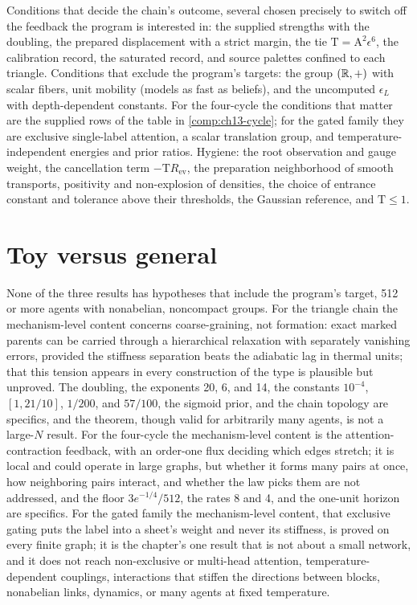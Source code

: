 \begin{hygiene}
Conditions that decide the chain's outcome, several chosen precisely to switch off the feedback the
program is interested in: the supplied strengths with the doubling, the prepared displacement with a strict
margin, the tie \(\mathrm T=\mathrm A^2\epsilon^6\), the calibration record, the saturated record, and source
palettes confined to each triangle. Conditions that exclude the program's targets: the group \((\mathbb R,+)\) with
scalar fibers, unit mobility (models as fast as beliefs), and the uncomputed \(\epsilon_L\) with
depth-dependent constants. For the four-cycle the conditions that matter are the supplied rows of the table
in \cref{comp:ch13-cycle}; for the gated family they are exclusive single-label attention, a scalar
translation group, and temperature-independent energies and prior ratios.
Hygiene: the root observation and gauge weight, the cancellation term \(-\mathrm TR_{\mathrm{ev}}\), the
preparation neighborhood of smooth transports, positivity and non-explosion of densities, the choice of
entrance constant and tolerance above their thresholds, the Gaussian reference, and \(\mathrm T\le1\).
\end{hygiene}

\section{Toy versus general}
\label{comp:ch13-toy}

None of the three results has hypotheses that include the program's target, 512 or more agents with
nonabelian, noncompact groups. For the triangle chain the mechanism-level content concerns coarse-graining,
not formation: exact marked parents can be carried through a hierarchical relaxation with separately
vanishing errors, provided the stiffness separation beats the adiabatic lag in thermal units; that this
tension appears in every construction of the type is plausible but unproved. The doubling, the exponents
20, 6, and 14, the constants \(10^{-4}\), \([1,21/10]\), \(1/200\), and \(57/100\), the sigmoid prior, and the
chain topology are specifics, and the theorem, though valid for arbitrarily many agents, is not a
large-\(N\) result. For the four-cycle the mechanism-level content is the attention-contraction feedback,
with an order-one flux deciding which edges stretch; it is local and could operate in large graphs, but
whether it forms many pairs at once, how neighboring pairs interact, and whether the law picks them are not
addressed, and the floor \(3e^{-1/4}/512\), the rates 8 and 4, and the one-unit horizon are specifics. For
the gated family the mechanism-level content, that exclusive gating puts the label into a sheet's weight and
never its stiffness, is proved on every finite graph; it is the chapter's one result that is not about a
small network, and it does not reach non-exclusive or multi-head attention, temperature-dependent
couplings, interactions that stiffen the directions between blocks, nonabelian links, dynamics, or many
agents at fixed temperature.

